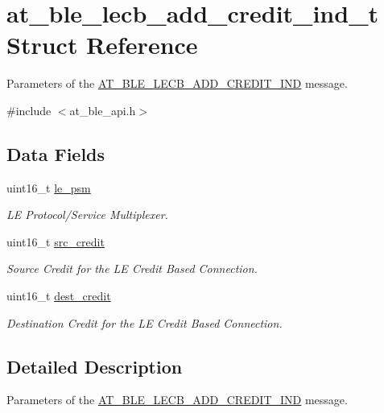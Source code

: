 \hypertarget{structat__ble__lecb__add__credit__ind__t}{}\section{at\+\_\+ble\+\_\+lecb\+\_\+add\+\_\+credit\+\_\+ind\+\_\+t Struct Reference}
\label{structat__ble__lecb__add__credit__ind__t}


Parameters of the \mbox{\hyperlink{at__ble__api_8h_a3324640b95f33169515f89738ed5baebaf2cacdabac494c8b868713acb484e1e7}{A\+T\+\_\+\+B\+L\+E\+\_\+\+L\+E\+C\+B\+\_\+\+A\+D\+D\+\_\+\+C\+R\+E\+D\+I\+T\+\_\+\+I\+ND}} message.  




{\ttfamily \#include $<$at\+\_\+ble\+\_\+api.\+h$>$}

\subsection*{Data Fields}
\begin{DoxyCompactItemize}
\item 
uint16\+\_\+t \mbox{\hyperlink{structat__ble__lecb__add__credit__ind__t_a2dad6ef37aefd9fc94375d265be0c7c9}{le\+\_\+psm}}
\begin{DoxyCompactList}\small\item\em LE Protocol/\+Service Multiplexer. \end{DoxyCompactList}\item 
uint16\+\_\+t \mbox{\hyperlink{structat__ble__lecb__add__credit__ind__t_a5e6b53fc6ab3be34fa0432c99ee05905}{src\+\_\+credit}}
\begin{DoxyCompactList}\small\item\em Source Credit for the LE Credit Based Connection. \end{DoxyCompactList}\item 
uint16\+\_\+t \mbox{\hyperlink{structat__ble__lecb__add__credit__ind__t_ac885778ddeb570d83c60b0d142d9de73}{dest\+\_\+credit}}
\begin{DoxyCompactList}\small\item\em Destination Credit for the LE Credit Based Connection. \end{DoxyCompactList}\end{DoxyCompactItemize}


\subsection{Detailed Description}
Parameters of the \mbox{\hyperlink{at__ble__api_8h_a3324640b95f33169515f89738ed5baebaf2cacdabac494c8b868713acb484e1e7}{A\+T\+\_\+\+B\+L\+E\+\_\+\+L\+E\+C\+B\+\_\+\+A\+D\+D\+\_\+\+C\+R\+E\+D\+I\+T\+\_\+\+I\+ND}} message. 

